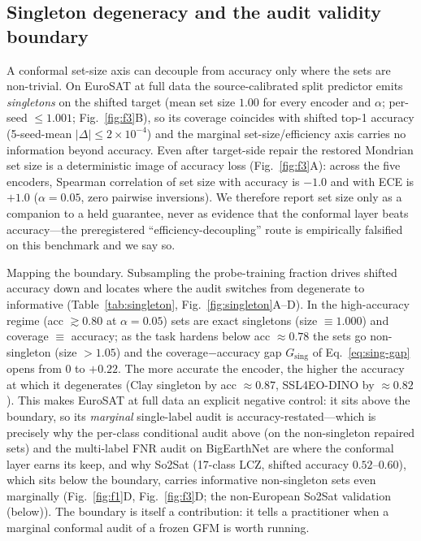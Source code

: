 \documentclass[preprint,11pt,authoryear]{elsarticle}
\begin{document}
\subsection*{Singleton degeneracy and the audit validity boundary}
A conformal set-size axis can decouple from accuracy only where the sets are non-trivial. On EuroSAT at
full data the source-calibrated split predictor emits \emph{singletons} on the shifted target (mean set
size $1.00$ for every encoder and $\alpha$; per-seed $\le1.001$; Fig.~\ref{fig:f3}B), so its coverage coincides with shifted
top-1 accuracy (5-seed-mean $|\Delta|\le2\times10^{-4}$) and the marginal set-size/efficiency axis carries
no information beyond accuracy. Even after target-side repair the restored Mondrian set size is a
deterministic image of accuracy loss (Fig.~\ref{fig:f3}A): across the five encoders, Spearman correlation of set size with
accuracy is $-1.0$ and with ECE is $+1.0$ ($\alpha{=}0.05$, zero pairwise inversions). We
therefore report set size only as a companion to a held guarantee, never as evidence that the conformal
layer beats accuracy---the preregistered ``efficiency-decoupling'' route is empirically falsified on this
benchmark and we say so.

Mapping the boundary. Subsampling the probe-training fraction drives shifted accuracy down and
locates where the audit switches from degenerate to informative (Table~\ref{tab:singleton},
Fig.~\ref{fig:singleton}A--D). In the
high-accuracy regime (acc $\gtrsim0.80$ at $\alpha{=}0.05$) sets are exact singletons (size $\equiv1.000$)
and coverage $\equiv$ accuracy; as the task hardens below acc $\approx0.78$ the sets go non-singleton
(size $>1.05$) and the coverage$-$accuracy gap $G_{\mathrm{sing}}$ of Eq.~\eqref{eq:sing-gap} opens from
$0$ to $+0.22$. The more accurate the encoder,
the higher the accuracy at which it degenerates (Clay singleton by acc $\approx0.87$, SSL4EO-DINO by
$\approx0.82$). This makes EuroSAT at full data an explicit negative control: it sits above
the boundary, so its \emph{marginal} single-label audit is accuracy-restated---which is precisely why the
per-class conditional audit above (on the non-singleton repaired sets) and the multi-label FNR audit
on BigEarthNet are where the conformal layer earns its keep, and why So2Sat (17-class LCZ, shifted accuracy
$0.52$--$0.60$), which sits below the boundary, carries informative non-singleton sets even
marginally (Fig.~\ref{fig:f1}D, Fig.~\ref{fig:f3}D; the non-European So2Sat validation (below)). The boundary is itself a contribution: it tells a practitioner when a
marginal conformal audit of a frozen GFM is worth running.
\end{document}

